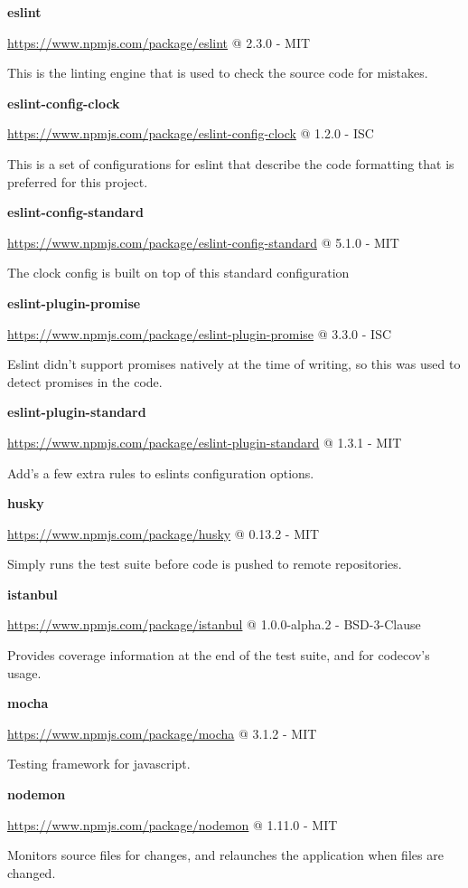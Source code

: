 \textbf{eslint}  

\url{https://www.npmjs.com/package/eslint} @ 2.3.0 - MIT

This is the linting engine that is used to check the source code for mistakes.

\textbf{eslint-config-clock} 

\url{https://www.npmjs.com/package/eslint-config-clock} @ 1.2.0 - ISC

This is a set of configurations for eslint that describe the code formatting that is preferred for this project.

\textbf{eslint-config-standard} 

\url{https://www.npmjs.com/package/eslint-config-standard} @ 5.1.0 - MIT

The clock config is built on top of this standard configuration

\textbf{eslint-plugin-promise} 

\url{https://www.npmjs.com/package/eslint-plugin-promise} @ 3.3.0 - ISC

Eslint didn't support promises natively at the time of writing, so this was used to detect promises in the code.

\textbf{eslint-plugin-standard} 

\url{https://www.npmjs.com/package/eslint-plugin-standard} @ 1.3.1 - MIT

Add's a few extra rules to eslints configuration options.

\textbf{husky} 

\url{https://www.npmjs.com/package/husky} @ 0.13.2 - MIT

Simply runs the test suite before code is pushed to remote repositories.

\textbf{istanbul} 

\url{https://www.npmjs.com/package/istanbul} @ 1.0.0-alpha.2 - BSD-3-Clause

Provides coverage information at the end of the test suite, and for codecov's usage.

\textbf{mocha} 

\url{https://www.npmjs.com/package/mocha} @ 3.1.2 - MIT

Testing framework for javascript.

\textbf{nodemon} 

\url{https://www.npmjs.com/package/nodemon} @ 1.11.0 - MIT

Monitors source files for changes, and relaunches the application when files are changed.

